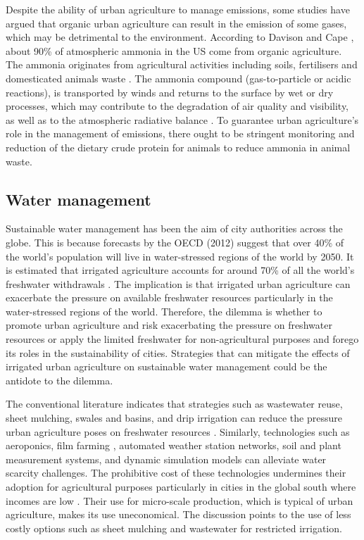 Despite the ability of urban agriculture to manage emissions, some studies have argued that organic urban agriculture can result in the emission of some gases, which may be detrimental to the environment. According to Davison and Cape \cite{Davison2003}, about 90\% of atmospheric ammonia in the US come from organic agriculture. The ammonia originates from agricultural activities including soils, fertilisers and domesticated animals waste \cite{Paulot2014}. The ammonia compound (gas-to-particle or acidic reactions), is transported by winds and returns to the surface by wet or dry processes, which may contribute to the degradation of air quality and visibility, as well as to the atmospheric radiative balance \cite{Aneja2015}. To guarantee urban agriculture's role in the management of emissions, there ought to be stringent monitoring and reduction of the dietary crude protein for animals to reduce ammonia in animal waste.

\subsection{Water management}

Sustainable water management has been the aim of city authorities across the globe. This is because forecasts by the OECD (2012) suggest that over 40\% of the world's population will live in water-stressed regions of the world by 2050. It is estimated that irrigated agriculture accounts for around 70\% of all the world's freshwater withdrawals \cite{Rosegrant2009}. The implication is that irrigated urban agriculture can exacerbate the pressure on available freshwater resources particularly in the water-stressed regions of the world. Therefore, the dilemma is whether to promote urban agriculture and risk exacerbating the pressure on freshwater resources or apply the limited freshwater for non-agricultural purposes and forego its roles in the sustainability of cities. Strategies that can mitigate the effects of irrigated urban agriculture on sustainable water management could be the antidote to the dilemma.

The conventional literature indicates that strategies such as wastewater reuse, sheet mulching, swales and basins, and drip irrigation can reduce the pressure urban agriculture poses on freshwater resources \cite{Ensink2004}. Similarly, technologies such as aeroponics, film farming \cite{Ayambire2019}, automated weather station networks, soil and plant measurement systems, and dynamic simulation models \cite{Itzhaky2010} can alleviate water scarcity challenges. The prohibitive cost of these technologies undermines their adoption for agricultural purposes particularly in cities in the global south where incomes are low \cite{Ayambire2019}. Their use for micro-scale production, which is typical of urban agriculture, makes its use uneconomical. The discussion points to the use of less costly options such as sheet mulching and wastewater for restricted irrigation.

